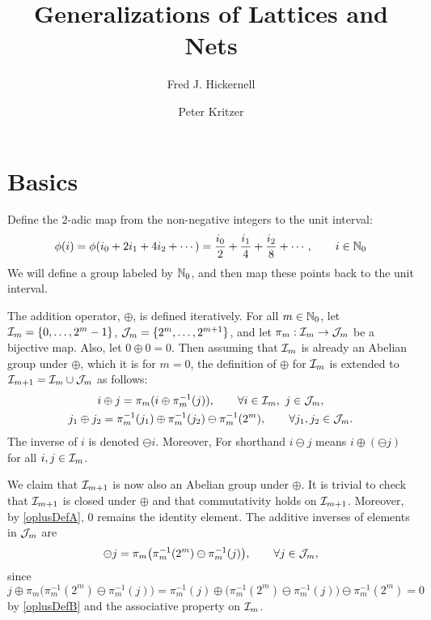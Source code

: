\documentclass[12pt]{amsart}
\title{Generalizations of Lattices and Nets}
\author{Fred J. Hickernell}
\author{Peter Kritzer}
\begin{document}
\maketitle

\section{Basics}

Define the $2$-adic map from the non-negative integers to the unit interval:
\begin{equation}
\phi(i) = \phi(i_0 + 2 i_1 + 4 i_2 + \cdots) = \frac{i_0}{2} + \frac{i_1}{4} + \frac{i_2} {8} + \cdots, \qquad i \in \mathbb{N}_{0}
\end{equation}
We will define a group labeled by $\mathbb{N}_{0}$, and then map these points back to the unit interval.

The addition operator, $\oplus$, is defined iteratively. For all $m \in \mathbb{N}_{0}$, let $\mathcal{I}_m = \{0, \ldots, 2^m -1\}$, $\mathcal{J}_m = \{2^m, \dots, 2^{m+1}\}$, and let $\pi_m:\mathcal{I}_m \to \mathcal{J}_m$ be a bijective map.  Also, let $0 \oplus 0 = 0$.  Then assuming that $\mathcal{I}_m$ is already an Abelian group under $\oplus$, which it is for $m=0$, the definition of $\oplus$ for $\mathcal{I}_m$ is extended to $\mathcal{I}_{m+1} = \mathcal{I}_m \cup \mathcal{J}_m$ as follows:
\begin{subequations} \label{oplusDef}
\begin{gather}
    \label{oplusDefA}
    i \oplus j = \pi_m( i \oplus \pi_m^{-1}(j)), \qquad \forall i \in \mathcal{I}_m,\ j \in \mathcal{J}_m, \\
    \label{oplusDefB}
    j_1 \oplus j_2 = \pi_m^{-1}( j_1) \oplus \pi_m^{-1}(j_2) \ominus \pi_m^{-1}(2^m), \qquad \forall j_1, j_2 \in \mathcal{J}_m.
\end{gather}
\end{subequations}
The inverse of $i$ is denoted $\ominus i$.  Moreover, For shorthand $i \ominus j$ means $i \oplus (\ominus j)$ for all $i, j \in \mathcal{I}_m$.

We claim that $\mathcal{I}_{m+1}$ is now also an Abelian group under $\oplus$.  It is trivial to check that $\mathcal{I}_{m+1}$ is closed under $\oplus$ and that commutativity holds on $\mathcal{I}_{m+1}$.  Moreover, by \eqref{oplusDefA}, $0$ remains the identity element.  The additive inverses of elements in $\mathcal{J}_m$ are 
\begin{equation}
    \ominus j = \pi_m\bigl (\pi_m^{-1}(2^m) \ominus \pi_m^{-1}(j) \bigr ) , \qquad \forall j \in \mathcal{J}_m,
\end{equation}
since 
\[
j \oplus \pi_m\bigl (\pi_m^{-1}(2^m) \ominus \pi_m^{-1}(j)  \bigr ) = \pi_m^{-1}( j) \oplus \bigl ( \pi_m^{-1}(2^m) \ominus \pi_m^{-1}(j) \bigr ) \ominus \pi_m^{-1}(2^m) = 0
\]
by  \eqref{oplusDefB} and the associative property on $\mathcal{I}_m$.  
\end{document}
